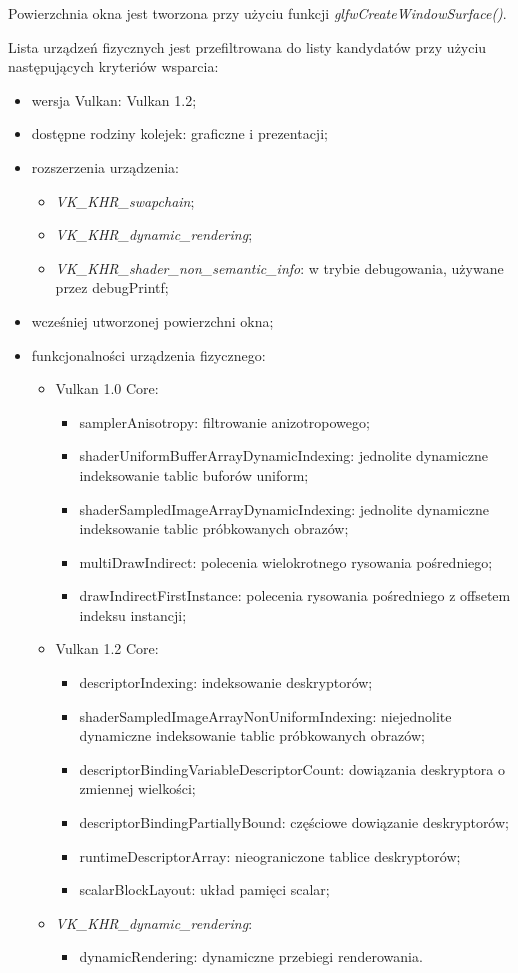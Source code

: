 Powierzchnia okna jest tworzona przy użyciu funkcji \textit{glfwCreateWindowSurface()}.

Lista urządzeń fizycznych jest przefiltrowana do listy kandydatów przy użyciu następujących kryteriów wsparcia:
\begin{itemize}
\item wersja Vulkan: Vulkan 1.2;
\item dostępne rodziny kolejek: graficzne i prezentacji;
\item rozszerzenia urządzenia:
	\begin{itemize}
	\item \textit{VK\_KHR\_swapchain};
	\item \textit{VK\_KHR\_dynamic\_rendering};
	\item \textit{VK\_KHR\_shader\_non\_semantic\_info}: w trybie debugowania, używane przez debugPrintf;
	\end{itemize}
\item wcześniej utworzonej powierzchni okna;
\item funkcjonalności urządzenia fizycznego:
	\begin{itemize}
	\item Vulkan 1.0 Core:
		\begin{itemize}
		\item samplerAnisotropy: filtrowanie anizotropowego;
		\item shaderUniformBufferArrayDynamicIndexing: jednolite dynamiczne indeksowanie tablic buforów uniform;
		\item shaderSampledImageArrayDynamicIndexing: jednolite dynamiczne indeksowanie tablic próbkowanych obrazów;
		\item multiDrawIndirect: polecenia wielokrotnego rysowania pośredniego;
		\item drawIndirectFirstInstance: polecenia rysowania pośredniego z offsetem indeksu instancji;
		\end{itemize}
	\item Vulkan 1.2 Core:
		\begin{itemize}
		\item descriptorIndexing: indeksowanie deskryptorów;
		\item shaderSampledImageArrayNonUniformIndexing: niejednolite dynamiczne indeksowanie tablic próbkowanych obrazów;
		\item descriptorBindingVariableDescriptorCount: dowiązania deskryptora o zmiennej wielkości;
		\item descriptorBindingPartiallyBound: częściowe dowiązanie deskryptorów;
		\item runtimeDescriptorArray: nieograniczone tablice deskryptorów;
		\item scalarBlockLayout: układ pamięci scalar;
		\end{itemize}
	\item \textit{VK\_KHR\_dynamic\_rendering}:
	\begin{itemize}
		\item dynamicRendering: dynamiczne przebiegi renderowania.
	\end{itemize}
	\end{itemize}
\end{itemize}
